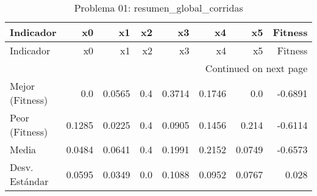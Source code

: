 \begin{longtable}{lrrrrrrr}
\caption{Problema 01: resumen\_global\_corridas}\label{tab:resumen_global_corridas} \\
\toprule
Indicador & x0 & x1 & x2 & x3 & x4 & x5 & Fitness \\
\midrule
\endfirsthead
\toprule
Indicador & x0 & x1 & x2 & x3 & x4 & x5 & Fitness \\
\midrule
\endhead
\midrule
\multicolumn{8}{r}{Continued on next page} \\
\midrule
\endfoot
\bottomrule
\endlastfoot
Mejor (Fitness) & 0.0 & 0.0565 & 0.4 & 0.3714 & 0.1746 & 0.0 & -0.6891 \\
Peor (Fitness) & 0.1285 & 0.0225 & 0.4 & 0.0905 & 0.1456 & 0.214 & -0.6114 \\
Media & 0.0484 & 0.0641 & 0.4 & 0.1991 & 0.2152 & 0.0749 & -0.6573 \\
Desv. Estándar & 0.0595 & 0.0349 & 0.0 & 0.1088 & 0.0952 & 0.0767 & 0.028 \\
\end{longtable}